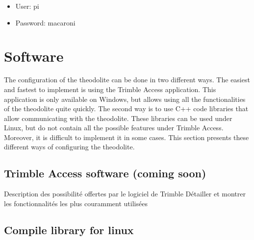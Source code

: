 \documentclass[10pt,letterpaper,oneside]{article}
\begin{document}
\begin{itemize}
    \item User: pi
    \item Password: macaroni
\end{itemize}

\section{Software}
\label{sec:software}

The configuration of the theodolite can be done in two different ways.
The easiest and fastest to implement is using the Trimble Access application.
This application is only available on Windows, but allows using all the functionalities of the theodolite quite quickly.
The second way is to use C++ code libraries that allow communicating with the theodolite.
These libraries can be used under Linux, but do not contain all the possible features under Trimble Access.
Moreover, it is difficult to implement it in some cases.
This section presents these different ways of configuring the theodolite.


\subsection{Trimble Access software (coming soon)}

Description des possibilité offertes par le logiciel de Trimble
Détailler et montrer les fonctionnalités les plus couramment utilisées

\subsection{Compile library for linux}
\end{document}

